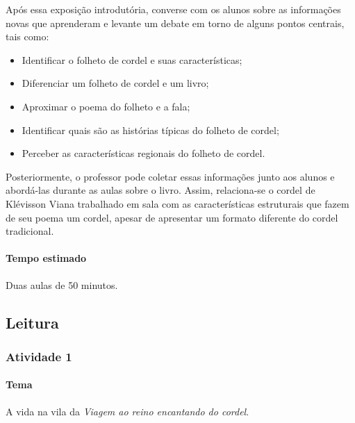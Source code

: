 \documentclass[11pt]{extarticle}
\begin{document}
Após essa exposição introdutória, converse com os alunos sobre as informações novas que aprenderam e levante um debate em torno de alguns pontos centrais, tais como:

\begin{itemize}
\item Identificar o folheto de cordel e suas características;

\item Diferenciar um folheto de cordel e um livro;

\item Aproximar o poema do folheto e a fala;

\item Identificar quais são as histórias típicas do folheto de cordel;

\item Perceber as características regionais do folheto de cordel.
\end{itemize}

Posteriormente, o professor pode coletar essas informações junto aos alunos e abordá-las durante as aulas sobre o livro. Assim, relaciona-se o cordel de Klévisson Viana trabalhado em sala com as características estruturais que fazem de seu poema um cordel, apesar de apresentar um formato diferente do cordel tradicional.


\paragraph{Tempo estimado} Duas aulas de 50 minutos.


\subsection{Leitura}

\subsubsection{Atividade 1}


\paragraph{Tema} A vida na vila da \textit{Viagem ao reino encantando do cordel}.
\end{document}
